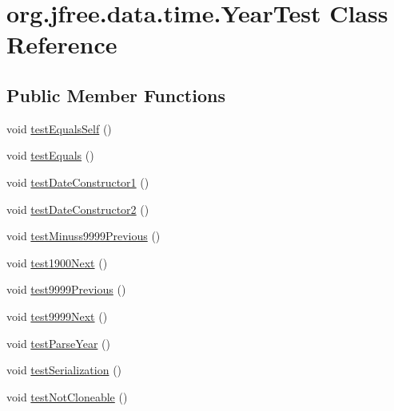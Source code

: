\hypertarget{classorg_1_1jfree_1_1data_1_1time_1_1_year_test}{}\section{org.\+jfree.\+data.\+time.\+Year\+Test Class Reference}
\label{classorg_1_1jfree_1_1data_1_1time_1_1_year_test}
\subsection*{Public Member Functions}
\begin{DoxyCompactItemize}
\item 
void \mbox{\hyperlink{classorg_1_1jfree_1_1data_1_1time_1_1_year_test_a6f52621df5e26573e6e61858a7c59cd6}{test\+Equals\+Self}} ()
\item 
void \mbox{\hyperlink{classorg_1_1jfree_1_1data_1_1time_1_1_year_test_a22b0724e0d3ff3dd28e20f5cb96b7fb6}{test\+Equals}} ()
\item 
void \mbox{\hyperlink{classorg_1_1jfree_1_1data_1_1time_1_1_year_test_ab5656720f153a8d9e713e7de14ee23f4}{test\+Date\+Constructor1}} ()
\item 
void \mbox{\hyperlink{classorg_1_1jfree_1_1data_1_1time_1_1_year_test_a9741cdf4a8467337a85298c592969122}{test\+Date\+Constructor2}} ()
\item 
void \mbox{\hyperlink{classorg_1_1jfree_1_1data_1_1time_1_1_year_test_a0e1c166ff2e087e2666e463bbcef4c9c}{test\+Minuss9999\+Previous}} ()
\item 
void \mbox{\hyperlink{classorg_1_1jfree_1_1data_1_1time_1_1_year_test_ac7c6cfc5bc25483114de1ef6d44699c6}{test1900\+Next}} ()
\item 
void \mbox{\hyperlink{classorg_1_1jfree_1_1data_1_1time_1_1_year_test_a08ffff831d915e8f175cb92ef101968b}{test9999\+Previous}} ()
\item 
void \mbox{\hyperlink{classorg_1_1jfree_1_1data_1_1time_1_1_year_test_a0db9503506b333800c6e825cd735bbce}{test9999\+Next}} ()
\item 
void \mbox{\hyperlink{classorg_1_1jfree_1_1data_1_1time_1_1_year_test_a802d076c1f445371c070df36c63dee47}{test\+Parse\+Year}} ()
\item 
void \mbox{\hyperlink{classorg_1_1jfree_1_1data_1_1time_1_1_year_test_a7b7e8d8a8a42e36860b7f07b06dc7281}{test\+Serialization}} ()
\item 
void \mbox{\hyperlink{classorg_1_1jfree_1_1data_1_1time_1_1_year_test_a1606428d29bad9b65ec83a56b2c75e40}{test\+Not\+Cloneable}} ()

\end{DoxyCompactItemize}
